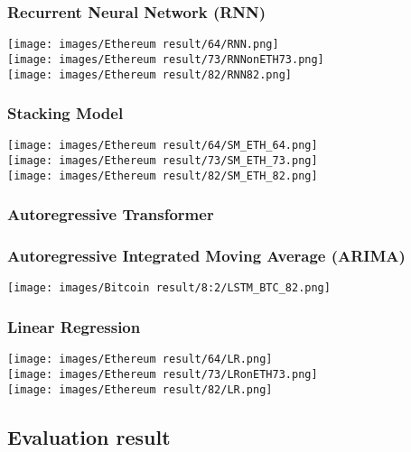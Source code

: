 \documentclass{ieeeojies}
\begin{document}
\subsubsection{Recurrent Neural Network (RNN)}
\texttt{[image: images/Ethereum result/64/RNN.png]}\\
\texttt{[image: images/Ethereum result/73/RNNonETH73.png]}\\
\texttt{[image: images/Ethereum result/82/RNN82.png]}\\

\subsubsection{Stacking Model}
\texttt{[image: images/Ethereum result/64/SM\_ETH\_64.png]}\\
\texttt{[image: images/Ethereum result/73/SM\_ETH\_73.png]}\\
\texttt{[image: images/Ethereum result/82/SM\_ETH\_82.png]}
\subsubsection{Autoregressive Transformer}
\subsubsection{Autoregressive Integrated Moving Average (ARIMA)}
\texttt{[image: images/Bitcoin result/8:2/LSTM\_BTC\_82.png]}
\subsubsection{Linear Regression}
\texttt{[image: images/Ethereum result/64/LR.png]}\\
\texttt{[image: images/Ethereum result/73/LRonETH73.png]}\\
\texttt{[image: images/Ethereum result/82/LR.png]}\\

\subsection{Evaluation result}
\end{document}
